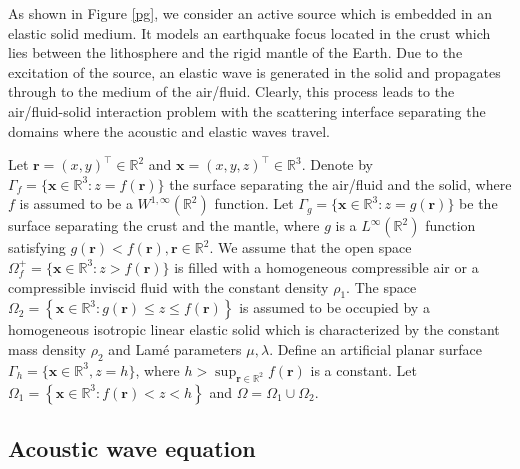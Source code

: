 \documentclass[final,leqno]{siamltex}
\begin{document}
As shown in Figure \ref{pg}, we consider an active source which is embedded in
an elastic solid medium. It models an earthquake focus located in the crust
which lies between the lithosphere and the rigid mantle of the Earth. Due to the
excitation of the source, an elastic wave is generated in the solid and
propagates through to the medium of the air/fluid. Clearly, this process leads
to the air/fluid-solid interaction problem with the scattering interface
separating the domains where the acoustic and elastic waves travel.

Let $\boldsymbol{r}=(x, y)^\top\in\mathbb{R}^2$ and
$\boldsymbol{x}=(x, y, z)^\top\in\mathbb{R}^3$. Denote by $\Gamma_f=
\{\boldsymbol x\in \mathbb R^3: z= f(\boldsymbol r)\}$ the surface separating
the air/fluid and the solid, where $f$ is assumed to be a $W^{1, \infty}(\mathbb
R^2)$ function. Let $\Gamma_g =\{\boldsymbol x\in \mathbb R^3: z = g(\boldsymbol
r)\}$ be the surface separating the crust and the mantle, where $g$ is a
$L^\infty(\mathbb R^2)$ function satisfying $g (\boldsymbol r) <
f(\boldsymbol r), \boldsymbol{r}\in\mathbb R^2$. We assume that the open space
$\Omega^{+}_f =\{ \boldsymbol x \in \mathbb R^3: z >  f(\boldsymbol r)\}$ is
filled with a homogeneous compressible air or a compressible inviscid fluid with
the constant density $\rho_1$. The space $ \Omega_2 =\left \{ \boldsymbol x \in
\mathbb R^3:  g (\boldsymbol r) \leq  z \leq f (\boldsymbol r) \right \}$
is assumed to be occupied by a homogeneous isotropic linear elastic solid
which is characterized by the constant mass density $\rho_2$ and Lam\'{e}
parameters $\mu, \lambda$. Define an artificial planar surface
$\Gamma_h=\{\boldsymbol x\in\mathbb{R}^3, z=h\}$, where
$h>\sup_{\boldsymbol r\in\mathbb{R}^2}f(\boldsymbol r)$ is a constant.
Let $\Omega_1= \left\{ \boldsymbol x \in \mathbb R^3: f (\boldsymbol r)< z <h
\right\}$ and $\Omega=\Omega_1 \cup \Omega_2.$

\subsection{Acoustic wave  equation}
\end{document}
